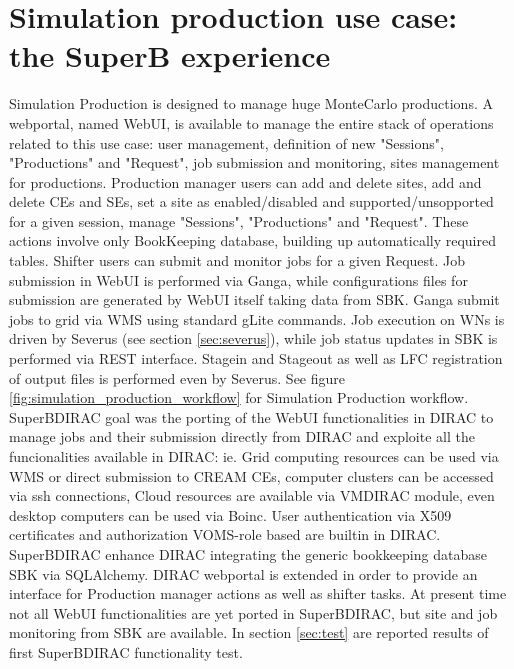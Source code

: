 \documentclass[a4paper]{jpconf}
\begin{document}
\section{Simulation production use case: the SuperB experience}
Simulation Production is designed to manage huge MonteCarlo productions.
A webportal, named WebUI\cite{ref:webui}, is available to manage the entire stack of operations related to this use case: user management, definition of new "Sessions", "Productions" and "Request", job submission and monitoring, sites management for productions. 
Production manager users can add and delete sites, add and delete CEs and SEs, set a site as enabled/disabled and supported/unsopported for a given session, manage "Sessions", "Productions" and "Request". These actions involve only BookKeeping database, building up automatically required tables.
Shifter users can submit and monitor jobs for a given Request. Job submission in WebUI is performed via Ganga\cite{ref:ganga}, while configurations files for submission are generated by WebUI itself taking data from SBK. Ganga submit jobs to grid via WMS using standard gLite commands. Job execution on WNs is driven by Severus (see section \ref{sec:severus}), while job status updates in SBK is performed via REST interface. Stagein and Stageout as well as LFC registration of output files is performed even by Severus. See figure \ref{fig:simulation_production_workflow} for Simulation Production workflow.\\

SuperBDIRAC goal was the porting of the WebUI functionalities in DIRAC to manage jobs and their submission directly from DIRAC and exploite all the funcionalities available in DIRAC: ie. Grid computing resources can be used via WMS or direct submission to CREAM CEs, computer clusters can be accessed via ssh connections, Cloud resources are available via VMDIRAC module, even desktop computers can be used via Boinc. User authentication via X509 certificates and authorization VOMS-role based are builtin in DIRAC.
SuperBDIRAC enhance DIRAC integrating the generic bookkeeping database SBK via SQLAlchemy.
DIRAC webportal is extended in order to provide an interface for Production manager actions as well as shifter tasks.
At present time not all WebUI functionalities are yet ported in SuperBDIRAC, but site and job monitoring from SBK are available.
In section \ref{sec:test} are reported results of first SuperBDIRAC functionality test.

\end{document}
